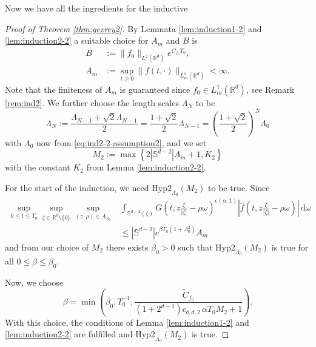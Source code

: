 \documentclass[11pt,a4paper,reqno]{amsart}
\theoremstyle{plain}
\theoremstyle{definition}
\begin{document}
Now we have all the ingredients for the inductive
\begin{proof}[Proof of Theorem \ref{thm:gevrey2}]
		By Lemmata \ref{lem:induction1-2} and \ref{lem:induction2-2} a suitable choice for $A_m$ and  $B$ is
 \begin{align*}
    B&:= \|f_0\|_{L^2({\mathbb{R}}^d)} e^{C_{f_0}T_0}, \\
    A_m&:= \sup_{t\geq 0} \|f(t, \cdot)\|_{L^1_m({\mathbb{R}}^d)} < \infty.
   \end{align*}
   Note that the finiteness of $A_m$ is guaranteed since $f_0 \in L^1_m({\mathbb{R}}^d)$, see Remark \ref{rem:ind2}. We further choose the length scales $\Lambda_N$ to be
  \begin{equation*}
    \Lambda_N := \frac{\Lambda_{N-1}+\sqrt{2}\Lambda_{N-1}}{2} = \frac{1+\sqrt{2}}{2}\Lambda_{N-1} =
    \left( \frac{1+\sqrt{2}}{2} \right)^N \Lambda_0
  \end{equation*}
  with  $\Lambda_0$ now from \eqref{eq:ind2-2-assumption2}, and we set
  \begin{equation*}
    M_2:= \max \left\{ 2 |{\mathbb{S}}^{d-2}|A_m+1, K_2 \right\}
  \end{equation*}	
  with the constant $K_2$ from Lemma \ref{lem:induction2-2}.

 For the start of the induction, we need $\mathrm{Hyp2}_{\Lambda_0}(M_2)$ to be true.
 Since
 \begin{align*}
 	\sup_{0\le t\le T_0}
 	\sup_{\zeta\in{\mathbb{R}}^d\setminus\{0\}} \sup_{(z,\rho)\in A_{\Lambda_0}}  &\int_{{\mathbb{S}}^{d-2}(\zeta)} G\left(t,z\tfrac{\zeta}{|\zeta|} - \rho \omega \right)^{\epsilon(\alpha, 1)} \left|\hat{f}\left(t,z\tfrac{\zeta}{|\zeta|} - \rho \omega \right)\right|\,\mathrm{d}\omega \\
 	&\le |{\mathbb{S}}^{d-2}|e^{\beta T_0 (1+\Lambda_0^2)} A_m
  \end{align*}
  and from our choice of $M_2$ there exists $\beta_0 >0$ such that $\mathrm{Hyp2}_{\Lambda_0}(M_2)$ is true for all $0\le\beta\le \beta_0$.

  Now, we choose
  \begin{equation*}
  	\beta=\min \left( \beta_0, T_0^{-1},\frac{\tilde{C}_{f_0}}{(1+2^{d-1}) c_{b,d,2} \, \alpha T_0 M_2 +1} \right).
  \end{equation*}
  With this choice, the conditions of Lemma \ref{lem:induction1-2} and \ref{lem:induction2-2} are fulfilled and $\mathrm{Hyp2}_{\Lambda_0}(M_2)$ is true.


\end{proof}
\end{document}
